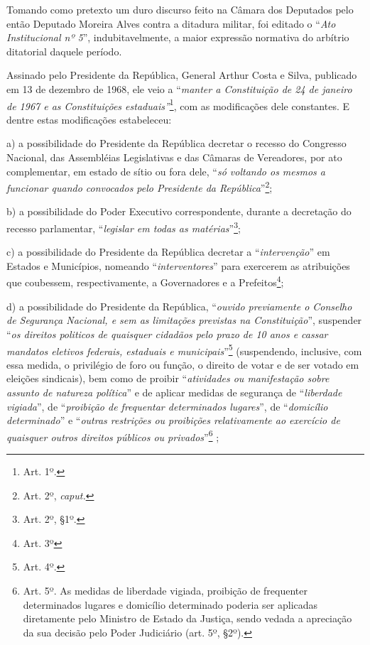 Tomando como pretexto um duro discurso feito na Câmara dos Deputados
pelo então Deputado Moreira Alves contra a ditadura militar, foi editado
o ``\emph{Ato Institucional nº 5}'', indubitavelmente, a maior expressão
normativa do arbítrio ditatorial daquele período.

Assinado pelo Presidente da República, General Arthur Costa e Silva,
publicado em 13 de dezembro de 1968, ele veio a ``\emph{manter a
Constituição de 24 de janeiro de 1967 e as Constituições
estaduais''}\footnote{Art. 1º.}, com as modificações dele constantes. E
dentre estas modificações estabeleceu:

a) a possibilidade do Presidente da República decretar o recesso do
Congresso Nacional, das Assembléias Legislativas e das Câmaras de
Vereadores, por ato complementar, em estado de sítio ou fora dele,
``\emph{só voltando os mesmos a funcionar quando convocados pelo
Presidente da República}''\footnote{Art. 2º, \emph{caput.}};

b) a possibilidade do Poder Executivo correspondente, durante a
decretação do recesso parlamentar, ``\emph{legislar em todas as
matérias}''\footnote{Art. 2º, §1º.};

c) a possibilidade do Presidente da República decretar a
``\emph{intervenção}'' em Estados e Municípios, nomeando
``\emph{interventores}'' para exercerem as atribuições que coubessem,
respectivamente, a Governadores e a Prefeitos\footnote{Art. 3º};

d) a possibilidade do Presidente da República, ``\emph{ouvido
previamente o Conselho de Segurança Nacional, e sem as limitações
previstas na Constituição}'', suspender ``\emph{os direitos politicos de
quaisquer cidadãos pelo prazo de 10 anos e cassar mandatos eletivos
federais, estaduais e municipais}''\footnote{Art. 4º.} (suspendendo,
inclusive, com essa medida, o privilégio de foro ou função, o direito de
votar e de ser votado em eleições sindicais), bem como de proibir
``\emph{atividades ou manifestação sobre assunto de natureza política}''
e de aplicar medidas de segurança de ``\emph{liberdade vigiada}'', de
``\emph{proibição de frequentar determinados lugares}'', de
``\emph{domicílio determinado}'' e ``\emph{outras restrições ou
proibições relativamente ao exercício de quaisquer outros direitos
públicos ou privados}''\footnote{Art. 5º. As medidas de liberdade
  vigiada, proibição de frequenter determinados lugares e domicílio
  determinado poderia ser aplicadas diretamente pelo Ministro de Estado
  da Justiça, sendo vedada a apreciação da sua decisão pelo Poder
  Judiciário (art. 5º, §2º).} ;

